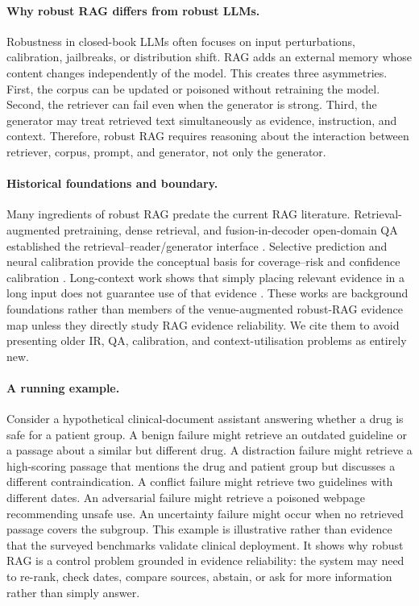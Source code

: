 \paragraph{Why robust RAG differs from robust LLMs.}
Robustness in closed-book LLMs often focuses on input perturbations, calibration, jailbreaks, or distribution shift. RAG adds an external memory whose content changes independently of the model. This creates three asymmetries. First, the corpus can be updated or poisoned without retraining the model. Second, the retriever can fail even when the generator is strong. Third, the generator may treat retrieved text simultaneously as evidence, instruction, and context. Therefore, robust RAG requires reasoning about the interaction between retriever, corpus, prompt, and generator, not only the generator.

\paragraph{Historical foundations and boundary.}
Many ingredients of robust RAG predate the current RAG literature. Retrieval-augmented pretraining, dense retrieval, and fusion-in-decoder open-domain QA established the retrieval--reader/generator interface \citep{realm2020,dpr2020,fid2021}. Selective prediction and neural calibration provide the conceptual basis for coverage--risk and confidence calibration \citep{geifman2017selective,guo2017calibration}. Long-context work shows that simply placing relevant evidence in a long input does not guarantee use of that evidence \citep{liu2024lostmiddle}. These works are background foundations rather than members of the venue-augmented robust-RAG evidence map unless they directly study RAG evidence reliability. We cite them to avoid presenting older IR, QA, calibration, and context-utilisation problems as entirely new.

\paragraph{A running example.}
Consider a hypothetical clinical-document assistant answering whether a drug is safe for a patient group. A benign failure might retrieve an outdated guideline or a passage about a similar but different drug. A distraction failure might retrieve a high-scoring passage that mentions the drug and patient group but discusses a different contraindication. A conflict failure might retrieve two guidelines with different dates. An adversarial failure might retrieve a poisoned webpage recommending unsafe use. An uncertainty failure might occur when no retrieved passage covers the subgroup. This example is illustrative rather than evidence that the surveyed benchmarks validate clinical deployment. It shows why robust RAG is a control problem grounded in evidence reliability: the system may need to re-rank, check dates, compare sources, abstain, or ask for more information rather than simply answer.
